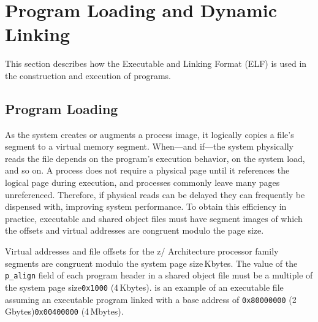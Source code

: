 \documentclass[USenglish,fontsize=11pt,twoside,%
  toc=bib,toc=idx,toc=graduated,numbers=noendperiod,
  bookmarks=true,
  bookmarksnumbered=true,
  bookmarksopen=true,
  bookmarksopenlevel=1,
  breaklinks=true,
  colorlinks=true,
  linkcolor=black,
  pdfpagelayout={TwoPageRight},
  pdfusetitle=true
]{scrreprt}
\newcommand{\ARCH}{z/\kern-1pt Ar\-chi\-tec\-ture}
\newcommand{\ARCH}{ESA/390}
\begin{document}
\chapter{Program Loading and Dynamic Linking}
\label{chprogload}
This section describes how the Executable and Linking Format (ELF) is
used in the construction and execution of programs.

\section{Program Loading}
As the system creates or augments a process image, it logically copies
a file's segment to a virtual memory segment.  When---and if---the
system physically reads the file depends on the program's execution
behavior, on the system load, and so on.  A process does not require a
physical page until it references the logical page during execution,
and processes commonly leave many pages unreferenced.  Therefore, if
physical reads can be delayed they can frequently be dispensed with,
improving system performance.  To obtain this efficiency in practice,
executable and shared object files must have segment images of which
the offsets and virtual addresses are congruent modulo the page size.

Virtual addresses and file offsets for the \ARCH{} processor family
segments are congruent modulo {\ifzseries the system page size$\,$Kbytes\fi}.  The value of the \texttt{p\_align} field of each
program header in a shared object file must be {\ifzseries a multiple
  of the system page size\else \texttt{0x1000} (4$\,$Kbytes)\fi}.
 is an example of an executable file assuming an
executable program linked with a base address of {\ifzseries
  \texttt{0x80000000} (2$\,$Gbytes)\else \texttt{0x00400000}
  (4$\,$Mbytes)\fi}.
\end{document}
